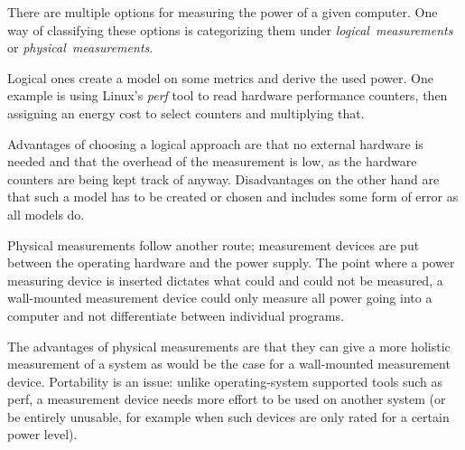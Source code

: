 There are multiple options for measuring the power of a given computer. One way of classifying these options is categorizing them under \emph{logical~measurements} or \emph{physical~measurements}.

Logical ones create a model on some metrics and derive the used power. One example is using Linux's \emph{perf} tool to read hardware performance counters, then assigning an energy cost to select counters and multiplying that. 

Advantages of choosing a logical approach are that no external hardware is needed and that the overhead of the measurement is low, as the hardware counters are being kept track of anyway. 
Disadvantages on the other hand are that such a model has to be created or chosen and includes some form of error as all models do.

Physical measurements follow another route; measurement devices are put between the operating hardware and the power supply. 
The point where a power measuring device is inserted dictates what could and could not be measured, a wall-mounted measurement device could only measure all power going into a computer and not differentiate between individual programs.

The advantages of physical measurements are that they can give a more holistic measurement of a system as would be the case for a wall-mounted measurement device. 
Portability is an issue: unlike operating-system supported tools such as perf, a measurement device needs more effort to be used on another system (or be entirely unusable, for example when such devices are only rated for a certain power level).

